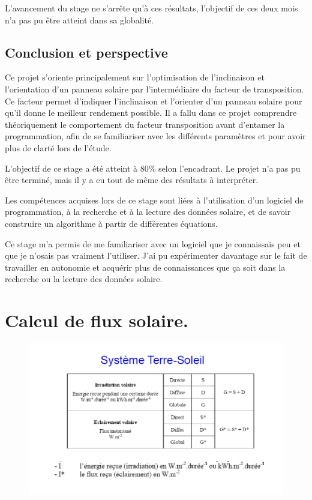 \documentclass[12pt,a4paper,openright]{report}
\begin{document}
L'avancement du stage ne s'arrête qu'à ces résultats, l'objectif de ces deux mois n'a pas pu être atteint dans sa globalité. 
\newpage
	\section*{Conclusion et perspective}
  Ce projet s'oriente principalement sur l'optimisation de l'inclinaison et l'orientation d'un panneau solaire par l'intermédiaire du facteur de transposition. Ce facteur permet d'indiquer l'inclinaison et l'orienter d'un panneau solaire pour qu'il donne le meilleur rendement possible. Il a fallu dans ce projet comprendre théoriquement le comportement du facteur transposition avant d'entamer la programmation, afin de se familiariser avec les différents paramètres et pour avoir plus de clarté lors de l'étude.
  
  L'objectif de ce stage a été atteint à 80\% selon l'encadrant. Le projet n'a pas pu être terminé, mais il y a eu tout de même des résultats à interpréter.
  
  Les compétences acquises lors de ce stage sont liées à l'utilisation d'un logiciel de programmation, à la recherche et à la lecture des données solaire, et de savoir construire un algorithme à partir de différentes équations.
  
  Ce stage m'a permis de me familiariser avec un logiciel que je connaissais peu et que je n'osais pas vraiment l'utiliser. J'ai pu expérimenter davantage sur le fait de travailler en autonomie et acquérir plus de connaissances que ça soit dans la recherche ou la lecture des données solaire.
  
	\newpage
	
\listoffigures
\newpage

\appendix
\chapter{Calcul de flux solaire.}
\begin{figure}[h!]
\includegraphics[scale=0.7]{RoyGlo}
\end{figure}
\end{document}
